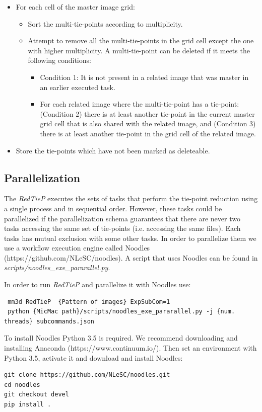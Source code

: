 \begin{itemize}
\begin{itemize}
   \item For each cell of the master image grid:
      \begin{itemize}
       \item Sort the multi-tie-points according to multiplicity.
       \item Attempt to remove all the multi-tie-points in the grid cell except the one with higher multiplicity. A multi-tie-point can be deleted if it meets the following conditions:
          \begin{itemize}
          \item Condition 1: It is not present in a related image that was master in an earlier executed task.
          \item For each related image where the multi-tie-point has a tie-point: (Condition 2) there is at least another tie-point in the current master grid cell that is also shared with the related image, and (Condition 3) there is at least another tie-point in the grid cell of the related image. 
          \end{itemize}
      \end{itemize}
   \item Store the tie-points which have not been marked as deleteable.
   \end{itemize}
\end{itemize}

\subsection{Parallelization}

The \textit{RedTieP} executes the sets of tasks that perform the tie-point reduction using a single process and in sequential order. However, these tasks could be parallelized if the parallelization schema guarantees that there are never two tasks accessing the same set of tie-points (i.e. accessing the same files). Each tasks has mutual exclusion with some other tasks. In order to parallelize them we use a workflow execution engine called Noodles (https://github.com/NLeSC/noodles). A script that uses Noodles can be found in \textit{scripts/noodles\_exe\_pararallel.py}.

In order to run \textit{RedTieP} and parallelize it with Noodles use:
\begin{verbatim}
 mm3d RedTieP  {Pattern of images} ExpSubCom=1 
 python {MicMac path}/scripts/noodles_exe_pararallel.py -j {num. threads} subcommands.json
\end{verbatim}

To install Noodles Python 3.5 is required. We recommend downloading and installing Anaconda (https://www.continuum.io/). Then set an environment with Python 3.5, activate it and download and install Noodles:
\begin{verbatim}
git clone https://github.com/NLeSC/noodles.git
cd noodles
git checkout devel
pip install .
\end{verbatim}


